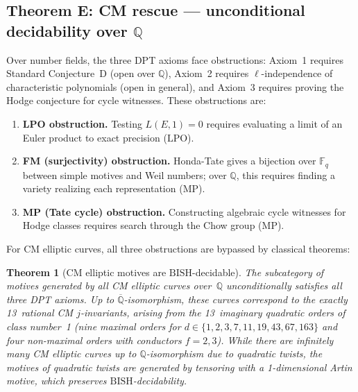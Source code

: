 \documentclass[11pt]{article}
\newtheorem{theorem}{Theorem}[section]
\theoremstyle{definition}
\theoremstyle{remark}
\newcommand{\Q}{\mathbb{Q}}
\newcommand{\Qbar}{\overline{\Q}}
\newcommand{\Fq}{\mathbb{F}_q}
\newcommand{\LPO}{\mathrm{LPO}}
\newcommand{\MP}{\mathrm{MP}}
\newcommand{\BISH}{\mathrm{BISH}}
\begin{document}
\subsection{Theorem E: CM rescue --- unconditional decidability over $\Q$}

Over number fields, the three DPT axioms face obstructions: Axiom~1 requires Standard Conjecture~D (open over $\Q$), Axiom~2 requires $\ell$-independence of characteristic polynomials (open in general), and Axiom~3 requires proving the Hodge conjecture for cycle witnesses. These obstructions are:

\begin{enumerate}
\item \textbf{LPO obstruction.} Testing $L(E,1) = 0$ requires evaluating a limit of an Euler product to exact precision ($\LPO$).
\item \textbf{FM (surjectivity) obstruction.} Honda-Tate gives a bijection over $\Fq$ between simple motives and Weil numbers; over $\Q$, this requires finding a variety realizing each representation ($\MP$).
\item \textbf{MP (Tate cycle) obstruction.} Constructing algebraic cycle witnesses for Hodge classes requires search through the Chow group ($\MP$).
\end{enumerate}

For CM elliptic curves, all three obstructions are bypassed by classical theorems:

\begin{theorem}[CM elliptic motives are $\BISH$-decidable]
\label{thm:E}
The subcategory of motives generated by all CM elliptic curves over~$\Q$ unconditionally satisfies all three DPT axioms. Up to $\Qbar$-isomorphism, these curves correspond to the exactly 13~rational CM $j$-invariants, arising from the 13~imaginary quadratic orders of class number~1 (nine maximal orders for $d \in \{1,2,3,7,11,19,43,67,163\}$ and four non-maximal orders with conductors $f = 2, 3$). While there are infinitely many CM elliptic curves up to $\Q$-isomorphism due to quadratic twists, the motives of quadratic twists are generated by tensoring with a 1-dimensional Artin motive, which preserves $\BISH$-decidability.
\end{theorem}
\end{document}
